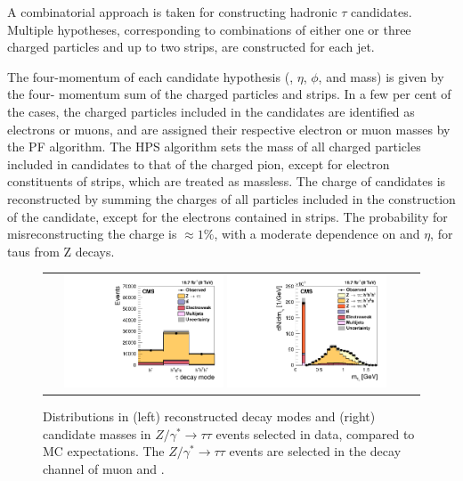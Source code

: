 A combinatorial approach is taken for constructing hadronic \ensuremath{\tau} candidates. Multiple \hadtau hypotheses, corresponding to combinations of either one or three charged particles and up to two strips, are constructed for each jet.

The four-momentum of each \hadtau candidate hypothesis (\pt, \ensuremath{\eta}, \ensuremath{\phi}, and mass) is given by the four- momentum sum of the charged particles and strips. In a few per cent of the cases, the charged particles included in the \hadtau candidates are identified as electrons or muons, and are assigned their respective electron or muon masses by the PF algorithm. The HPS algorithm sets the mass of all charged particles included in \hadtau candidates to that of the charged pion, except for electron constituents of strips, which are treated as massless. The charge of \hadtau candidates is reconstructed by summing the charges of all particles included in the construction of the \hadtau candidate, except for the electrons contained in strips. The probability for misreconstructing the \hadtau charge is \ensuremath{\approx 1 \%}, with a moderate dependence on \pt and \ensuremath{\eta}, for taus from Z decays.

\begin{figure}[tbh!]
	\centering
	\begin{tabular}{cc}
		\includegraphics[width=0.45\textwidth]{objreconstruction/pics/scalefactors050314.png}
		\includegraphics[width=0.45\textwidth]{objreconstruction/pics/plots_paper_tauIdAlgorithm_ZTT_mTau_ZTT_linear.png} 		
	\end{tabular}
	\caption{Distributions in (left) reconstructed \hadtau decay modes and (right) \hadtau candidate masses in \ensuremath{Z/\gamma^{*} \longrightarrow \tau\tau}  events selected in data, compared to MC expectations. The \ensuremath{Z/\gamma^{*} \longrightarrow \tau\tau}  events are selected in the decay channel of muon and \hadtau \cite{Khachatryan:2015dfa}.}
	\label{fig:Ztautau_decaymodes}
\end{figure}


